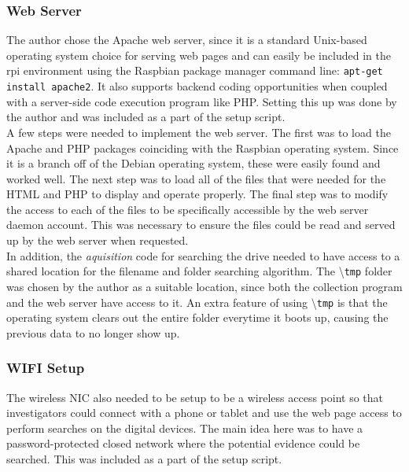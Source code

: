 \documentclass[12pt]{article}
\begin{document}
\subsubsection{Web Server}

The author chose the Apache web server, since it is a standard Unix-based operating system
choice for serving web pages and can easily be included in the \gls{rpi} environment using
the Raspbian package manager command line: \verb|apt-get install apache2|.  It also supports
backend coding opportunities when coupled with a server-side code execution program like PHP.
Setting this up was done by the author and was included as a part of the setup script.\\

A few steps were needed to implement the web server.  The first was to
load the Apache and PHP packages coinciding with the Raspbian operating system.  
Since it is a branch off of the Debian operating system, these were easily found and
worked well.  The next step was to load all of the files that were needed for
the HTML and PHP to display and operate properly.  The final step was to modify
the access to each of the files to be specifically accessible by the web
server daemon account.  This was necessary to ensure the files could be read and
served up by the web server when requested.\\

In addition, the {\em aquisition} code for searching the drive needed to have 
access to a shared location for the filename and folder searching algorithm.
The \textbackslash{}\verb|tmp| folder was chosen by the author as a suitable location, since
both the collection program and the web server have access to it.  An extra
feature of using \textbackslash{}\verb|tmp| is that the operating system clears
out the entire folder everytime it boots up, causing the previous data to no
longer show up.\\

\subsubsection{WIFI Setup}

The wireless NIC also needed to be setup to be a wireless access point so that
investigators could connect with a phone or tablet and use the web page access
to perform searches on the digital devices.  The main idea here was to have a 
password-protected closed network where the potential evidence could be searched.
This was included as a part of the setup script.\\
\end{document}
